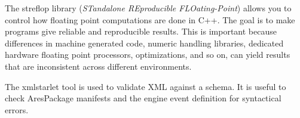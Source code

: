 
The streflop library ({\it STandalone REproducible FLOating-Point}) allows you to control how floating point computations are done in C++. The goal is to make programs give reliable and reproducible results. This is important because differences in machine generated code, numeric handling libraries, dedicated hardware floating point processors, optimizations, and so on, can yield results that are inconsistent across different environments.


The xmlstarlet tool is used to validate XML against a schema. It is useful to check AresPackage manifests and the engine event definition for syntactical errors.
\stopitemize

